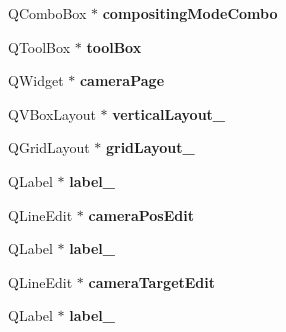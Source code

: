 \begin{DoxyCompactItemize}
\item 
\hypertarget{class_ui___scene_widget_a8560617b165d4c0d8f1f8a0530297905}{\-Q\-Combo\-Box $\ast$ {\bfseries compositing\-Mode\-Combo}}\label{class_ui___scene_widget_a8560617b165d4c0d8f1f8a0530297905}

\item 
\hypertarget{class_ui___scene_widget_ae3c7cd734924b860fdb741054212e4ad}{\-Q\-Tool\-Box $\ast$ {\bfseries tool\-Box}}\label{class_ui___scene_widget_ae3c7cd734924b860fdb741054212e4ad}

\item 
\hypertarget{class_ui___scene_widget_af1900bae9cea9d8a6076fa7e2887ca54}{\-Q\-Widget $\ast$ {\bfseries camera\-Page}}\label{class_ui___scene_widget_af1900bae9cea9d8a6076fa7e2887ca54}

\item 
\hypertarget{class_ui___scene_widget_aef43b897eacf65772aed6f315f44c864}{\-Q\-V\-Box\-Layout $\ast$ {\bfseries vertical\-Layout\-\_}}\label{class_ui___scene_widget_aef43b897eacf65772aed6f315f44c864}

\item 
\hypertarget{class_ui___scene_widget_ac76860e2b33dbaf7ceb4ce69738c2855}{\-Q\-Grid\-Layout $\ast$ {\bfseries grid\-Layout\-\_}}\label{class_ui___scene_widget_ac76860e2b33dbaf7ceb4ce69738c2855}

\item 
\hypertarget{class_ui___scene_widget_ad1a51060cbb08038b02c30e5fe67f9d4}{\-Q\-Label $\ast$ {\bfseries label\-\_}}\label{class_ui___scene_widget_ad1a51060cbb08038b02c30e5fe67f9d4}

\item 
\hypertarget{class_ui___scene_widget_a0bca1892a2b1030a650567476ccb970b}{\-Q\-Line\-Edit $\ast$ {\bfseries camera\-Pos\-Edit}}\label{class_ui___scene_widget_a0bca1892a2b1030a650567476ccb970b}

\item 
\hypertarget{class_ui___scene_widget_a26d5ea7e349ddad96c480ccd94e5a0fd}{\-Q\-Label $\ast$ {\bfseries label\-\_}}\label{class_ui___scene_widget_a26d5ea7e349ddad96c480ccd94e5a0fd}

\item 
\hypertarget{class_ui___scene_widget_a3c4472bc35be92108ee99fff33cfe73c}{\-Q\-Line\-Edit $\ast$ {\bfseries camera\-Target\-Edit}}\label{class_ui___scene_widget_a3c4472bc35be92108ee99fff33cfe73c}

\item 
\hypertarget{class_ui___scene_widget_a769cde447a95be02cd75a533302e9b17}{\-Q\-Label $\ast$ {\bfseries label\-\_}}\label{class_ui___scene_widget_a769cde447a95be02cd75a533302e9b17}


\end{DoxyCompactItemize}
